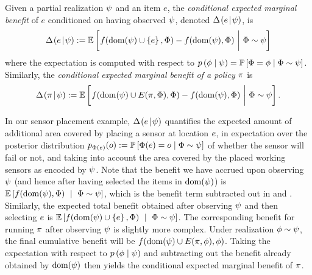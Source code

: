 \begin{definition} \label{def:conditional-marginal-gain}
Given a partial realization $\prlz$ and an item $e$, the 
  \emph{conditional expected marginal benefit} of $e$ 
 conditioned on having observed $\prlz$, denoted $\diff{\prlz}{\elem}$, is 
\begin{equation}
   \label{eq:adaptive-derivative-def}
   \diff{\prlz}{\elem} :=
 \expctoverrlz{\rlz}{\frac{}{}\!  f(\dom(\prlz) \cup \set{\elem}, \rvrlz) -
   f(\dom(\prlz), \rvrlz)\ \bigg| \ \rvrlz\sim\prlz}%
 \end{equation}
where the expectation is computed with respect to $\rlzmass{\rlz \mid
  \prlz} = \Pr{\rvrlz = \rlz
  \mid \rvrlz \sim \prlz}$. 
Similarly, the \emph{conditional expected marginal benefit of a
  policy} $\policy$ is 
\begin{equation}
   \label{eq:adaptive-derivative-policy-def}
   \diff{\prlz}{\policy} :=
 \expctoverrlz{\rlz}{\frac{}{}\!  f(\dom(\prlz) \cup \played{\policy}{\rvrlz}, \rvrlz) -
   f(\dom(\prlz), \rvrlz)\ \bigg| \ \rvrlz\sim\prlz}\mbox{.}  
 \end{equation}
\end{definition}
 
\noindent 
In our sensor placement example, $\diff{\prlz}{\elem}$
quantifies the expected amount of additional area covered by placing a
sensor at location $\elem$, in expectation over the posterior
distribution 
$\rlzmassover{\rvrlz(\elem)}{\outcome} := \Pr{\rvrlz(\elem) = \outcome \mid \rvrlz \sim \prlz}$
of whether the sensor will fail or not, and taking into account the
area covered by the placed working sensors as encoded by $\prlz$.
Note that the benefit we have accrued upon observing $\prlz$ (and
hence after having selected the items in $\dom(\prlz)$) is $\expct{
  f(\dom(\prlz), \rvrlz)\ \mid \ \rvrlz\sim\prlz}$, which is the
benefit term subtracted out in  and
. 
Similarly, the expected total benefit obtained after observing $\prlz$
and then selecting $\elem$ is $\expct{f(\dom(\prlz) \cup \set{\elem},
  \rvrlz)\ \mid \ \rvrlz\sim\prlz}$.  The corresponding benefit for
running $\policy$ after observing $\prlz$ is slightly more complex.
Under realization $\rlz \sim \prlz$, the final cumulative benefit will
be $f(\dom(\prlz) \cup \played{\policy}{\rlz}, \rlz)$.  Taking the
expectation with respect to $\rlzmass{\rlz \mid \prlz}$ and
subtracting out the benefit already obtained by $\dom(\prlz)$ then yields
the conditional expected marginal benefit of $\policy$.


